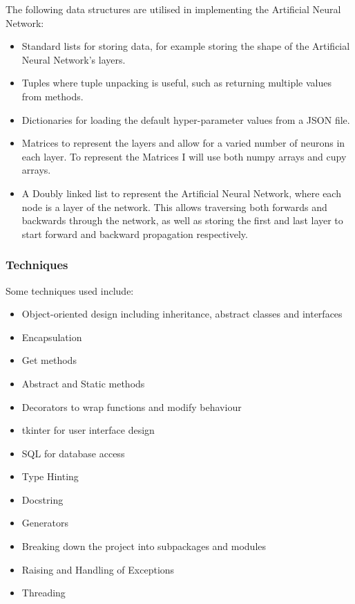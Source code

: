 \documentclass[./project-report/src/latex/project-report.tex]{subfiles}
\begin{document}
The following data structures are utilised in implementing the Artificial Neural Network:

\begin{itemize}
    \item Standard lists for storing data, for example storing the shape of the Artificial Neural Network's layers.
    \item Tuples where tuple unpacking is useful, such as returning multiple values from methods.
    \item Dictionaries for loading the default hyper-parameter values from a JSON file.
    \item Matrices to represent the layers and allow for a varied number of neurons in each layer. To represent the Matrices I will use both numpy arrays and cupy 
          arrays.
    \item A Doubly linked list to represent the Artificial Neural Network, where each node is a layer of the network. This allows traversing both forwards and 
          backwards through the network, as well as storing the first and last layer to start forward and backward propagation respectively.
\end{itemize}

\subsubsection{Techniques}

Some techniques used include:

\begin{itemize}
    \item Object-oriented design including inheritance, abstract classes and interfaces
    \item Encapsulation
	\item Get methods
	\item Abstract and Static methods
    \item Decorators to wrap functions and modify behaviour
    \item tkinter for user interface design
    \item SQL for database access
	\item Type Hinting
	\item Docstring
	\item Generators
	\item Breaking down the project into subpackages and modules
	\item Raising and Handling of Exceptions
	\item Threading
\end{itemize}
\end{document}
